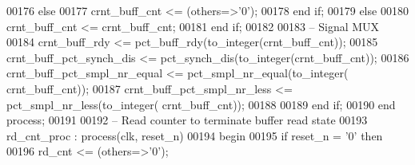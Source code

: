 \begin{DoxyCode}
00176             \textcolor{keywordflow}{else} 
00177                \textcolor{vhdlchar}{crnt_buff_cnt} \textcolor{vhdlchar}{<=} \textcolor{vhdlchar}{(}\textcolor{keywordflow}{others}\textcolor{vhdlchar}{=}\textcolor{vhdlchar}{>}\textcolor{vhdlchar}{'}\textcolor{vhdllogic}{}\textcolor{vhdllogic}{0}\textcolor{vhdlchar}{'}\textcolor{vhdlchar}{)};
00178             \textcolor{keywordflow}{end} \textcolor{keywordflow}{if};
00179          \textcolor{keywordflow}{else} 
00180             \textcolor{vhdlchar}{crnt_buff_cnt} \textcolor{vhdlchar}{<=} \textcolor{vhdlchar}{crnt_buff_cnt};
00181          \textcolor{keywordflow}{end} \textcolor{keywordflow}{if};
00182          
00183 \textcolor{keyword}{         -- Signal MUX}
00184          \textcolor{vhdlchar}{crnt_buff_rdy}               \textcolor{vhdlchar}{<=} \textcolor{vhdlchar}{pct_buff_rdy}\textcolor{vhdlchar}{(}\textcolor{vhdlchar}{to\_integer}\textcolor{vhdlchar}{(}\textcolor{vhdlchar}{crnt_buff_cnt}\textcolor{vhdlchar}{)}\textcolor{vhdlchar}{)}; 
00185          \textcolor{vhdlchar}{crnt_buff_pct_synch_dis}     \textcolor{vhdlchar}{<=} \textcolor{vhdlchar}{pct_synch_dis}\textcolor{vhdlchar}{(}\textcolor{vhdlchar}{to\_integer}\textcolor{vhdlchar}{(}\textcolor{vhdlchar}{crnt_buff_cnt}\textcolor{vhdlchar}{)}\textcolor{vhdlchar}{)};
00186          \textcolor{vhdlchar}{crnt_buff_pct_smpl_nr_equal} \textcolor{vhdlchar}{<=} \textcolor{vhdlchar}{pct_smpl_nr_equal}\textcolor{vhdlchar}{(}\textcolor{vhdlchar}{to\_integer}\textcolor{vhdlchar}{(}\textcolor{vhdlchar}{
      crnt_buff_cnt}\textcolor{vhdlchar}{)}\textcolor{vhdlchar}{)};
00187          \textcolor{vhdlchar}{crnt_buff_pct_smpl_nr_less}  \textcolor{vhdlchar}{<=} \textcolor{vhdlchar}{pct_smpl_nr_less}\textcolor{vhdlchar}{(}\textcolor{vhdlchar}{to\_integer}\textcolor{vhdlchar}{(}\textcolor{vhdlchar}{
      crnt_buff_cnt}\textcolor{vhdlchar}{)}\textcolor{vhdlchar}{)};
00188          
00189       \textcolor{keywordflow}{end} \textcolor{keywordflow}{if};
00190    \textcolor{keywordflow}{end} \textcolor{keywordflow}{process};
00191    
00192 \textcolor{keyword}{   -- Read counter to terminate buffer read state}
00193    rd\_cnt\_proc : \textcolor{keywordflow}{process}(clk, reset_n)
00194 \textcolor{vhdlkeyword}{   begin}
00195       \textcolor{keywordflow}{if} \textcolor{vhdlchar}{reset_n} \textcolor{vhdlchar}{=} \textcolor{vhdlchar}{'}\textcolor{vhdllogic}{}\textcolor{vhdllogic}{0}\textcolor{vhdlchar}{'} \textcolor{keywordflow}{then} 
00196          \textcolor{vhdlchar}{rd_cnt} \textcolor{vhdlchar}{<=} \textcolor{vhdlchar}{(}\textcolor{keywordflow}{others}\textcolor{vhdlchar}{=}\textcolor{vhdlchar}{>}\textcolor{vhdlchar}{'}\textcolor{vhdllogic}{}\textcolor{vhdllogic}{0}\textcolor{vhdlchar}{'}\textcolor{vhdlchar}{)};

\end{DoxyCode}
